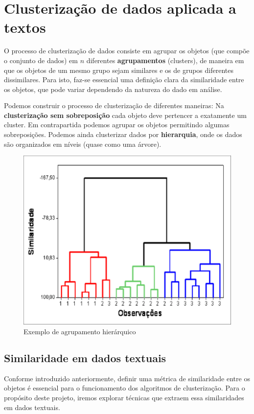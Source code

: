  
 \chapter{Clusterização de dados aplicada a textos}\label{cap:clus}
 
 O processo de clusterização de dados consiste em agrupar os objetos (que compõe o conjunto de dados) em $n$ diferentes \textbf{agrupamentos} (clusters), de maneira em que os objetos de um mesmo grupo sejam similares e os de grupos diferentes dissimilares.
 Para isto, faz-se essencial uma definição clara da similaridade entre os objetos, que pode variar dependendo da natureza do dado em análise.
 
 Podemos construir o processo de clusterização de diferentes maneiras: Na \textbf{clusterização sem sobreposição} cada objeto deve pertencer a exatamente um cluster. 
 Em contrapartida podemos agrupar os objetos permitindo algumas sobreposições. 
 Podemos ainda clusterizar dados por \textbf{hierarquia}, onde os dados são organizados em níveis (quase como uma árvore).
 
 \begin{figure}[H]
   \centering
   \includegraphics[scale=0.50]{figs/cluster_h.png}
    \caption{Exemplo de agrupamento hierárquico}
    \label{fig:clusterh}
 \end{figure}
 
 \pagebreak
 
 \section{Similaridade em dados textuais}
 Conforme introduzido anteriormente, definir uma métrica de similaridade entre os objetos é essencial para o funcionamento dos algoritmos de clusterização.
 Para o propósito deste projeto, iremos explorar técnicas que extraem essa similaridades em dados textuais.
 
